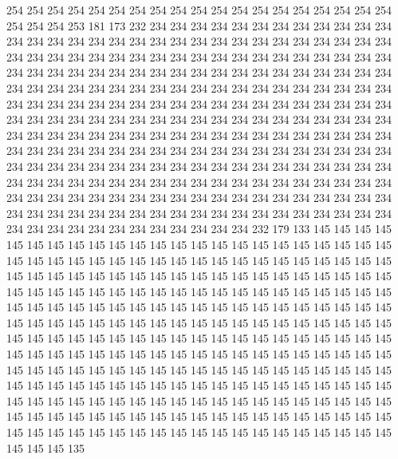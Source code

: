 254 254 254 254 254 254 254 254 254 254 254 254 254 254 254 254 254 254 254 254
254 254 253 181 173 232 234 234 234 234 234 234 234 234 234 234 234 234 234 234
234 234 234 234 234 234 234 234 234 234 234 234 234 234 234 234 234 234 234 234
234 234 234 234 234 234 234 234 234 234 234 234 234 234 234 234 234 234 234 234
234 234 234 234 234 234 234 234 234 234 234 234 234 234 234 234 234 234 234 234
234 234 234 234 234 234 234 234 234 234 234 234 234 234 234 234 234 234 234 234
234 234 234 234 234 234 234 234 234 234 234 234 234 234 234 234 234 234 234 234
234 234 234 234 234 234 234 234 234 234 234 234 234 234 234 234 234 234 234 234
234 234 234 234 234 234 234 234 234 234 234 234 234 234 234 234 234 234 234 234
234 234 234 234 234 234 234 234 234 234 234 234 234 234 234 234 234 234 234 234
234 234 234 234 234 234 234 234 234 234 234 234 234 234 234 234 234 234 234 234
234 234 234 234 234 234 234 234 234 234 234 234 234 234 234 234 234 234 234 234
234 234 234 234 234 234 234 234 234 234 234 234 234 234 234 234 234 234 234 234
234 234 234 234 234 234 234 234 234 234 234 234 234 234 234 234 234 234 232 179
133 145 145 145 145 145 145 145 145 145 145 145 145 145 145 145 145 145 145 145
145 145 145 145 145 145 145 145 145 145 145 145 145 145 145 145 145 145 145 145
145 145 145 145 145 145 145 145 145 145 145 145 145 145 145 145 145 145 145 145
145 145 145 145 145 145 145 145 145 145 145 145 145 145 145 145 145 145 145 145
145 145 145 145 145 145 145 145 145 145 145 145 145 145 145 145 145 145 145 145
145 145 145 145 145 145 145 145 145 145 145 145 145 145 145 145 145 145 145 145
145 145 145 145 145 145 145 145 145 145 145 145 145 145 145 145 145 145 145 145
145 145 145 145 145 145 145 145 145 145 145 145 145 145 145 145 145 145 145 145
145 145 145 145 145 145 145 145 145 145 145 145 145 145 145 145 145 145 145 145
145 145 145 145 145 145 145 145 145 145 145 145 145 145 145 145 145 145 145 145
145 145 145 145 145 145 145 145 145 145 145 145 145 145 145 145 145 145 145 145
145 145 145 145 145 145 145 145 145 145 145 145 145 145 145 145 145 145 145 145
145 145 145 145 145 145 145 145 145 145 145 145 145 145 145 135

